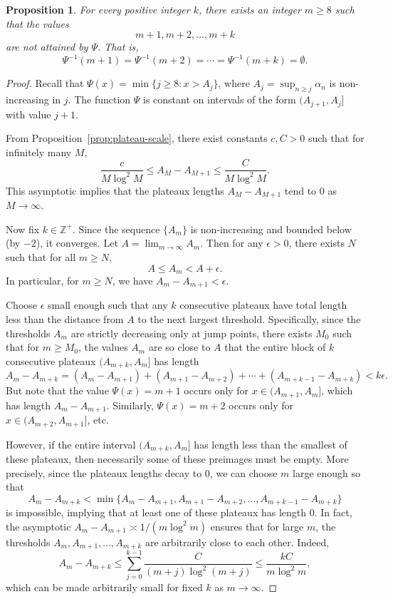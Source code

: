 \documentclass[10pt]{amsart}
\newtheorem{proposition}{Proposition}[section] %
\theoremstyle{definition} %
\numberwithin{equation}{section}
\begin{document}
\begin{proposition}\label{prop:psi-gaps}
For every positive integer $k$, there exists an integer $m \geq 8$ such that the values 
\[
m+1, m+2, \dots, m+k
\]
are not attained by $\Psi$. That is, 
\[
\Psi^{-1}(m+1) = \Psi^{-1}(m+2) = \cdots = \Psi^{-1}(m+k) = \emptyset.
\]
\end{proposition}

\begin{proof}
Recall that $\Psi(x) = \min \{ j \geq 8 : x > A_j \}$, where $A_j = \sup_{n \geq j} \alpha_n$ is non-increasing in $j$. The function $\Psi$ is constant on intervals of the form $(A_{j+1}, A_j]$ with value $j+1$.

From Proposition~\ref{prop:plateau-scale}, there exist constants $c, C > 0$ such that for infinitely many $M$,
\[
\frac{c}{M \log^2 M} \leq A_M - A_{M+1} \leq \frac{C}{M \log^2 M}.
\]
This asymptotic implies that the plateaux lengths $A_M - A_{M+1}$ tend to $0$ as $M \to \infty$.

Now fix $k \in \mathbb{Z}^+$. Since the sequence $\{A_m\}$ is non-increasing and bounded below (by $-2$), it converges. Let $A = \lim_{m \to \infty} A_m$. Then for any $\epsilon > 0$, there exists $N$ such that for all $m \geq N$,
\[
A \leq A_m < A + \epsilon.
\]
In particular, for $m \geq N$, we have $A_m - A_{m+1} < \epsilon$.

Choose $\epsilon$ small enough such that any $k$ consecutive plateaux have total length less than the distance from $A$ to the next largest threshold. Specifically, since the thresholds $A_m$ are strictly decreasing only at jump points, there exists $M_0$ such that for $m \geq M_0$, the values $A_m$ are so close to $A$ that the entire block of $k$ consecutive plateaux $(A_{m+k}, A_m]$ has length
\[
A_m - A_{m+k} = (A_m - A_{m+1}) + (A_{m+1} - A_{m+2}) + \cdots + (A_{m+k-1} - A_{m+k}) < k \epsilon.
\]
But note that the value $\Psi(x) = m+1$ occurs only for $x \in (A_{m+1}, A_m]$, which has length $A_m - A_{m+1}$. Similarly, $\Psi(x) = m+2$ occurs only for $x \in (A_{m+2}, A_{m+1}]$, etc.

However, if the entire interval $(A_{m+k}, A_m]$ has length less than the smallest of these plateaux, then necessarily some of these preimages must be empty. More precisely, since the plateaux lengths decay to $0$, we can choose $m$ large enough so that
\[
A_m - A_{m+k} < \min \{ A_m - A_{m+1}, A_{m+1} - A_{m+2}, \dots, A_{m+k-1} - A_{m+k} \}
\]
is impossible, implying that at least one of these plateaux has length $0$. In fact, the asymptotic $A_m - A_{m+1} \asymp 1/(m \log^2 m)$ ensures that for large $m$, the thresholds $A_m, A_{m+1}, \dots, A_{m+k}$ are arbitrarily close to each other. Indeed,
\[
A_m - A_{m+k} \leq \sum_{j=0}^{k-1} \frac{C}{(m+j) \log^2 (m+j)} \leq \frac{kC}{m \log^2 m},
\]
which can be made arbitrarily small for fixed $k$ as $m \to \infty$.


\end{proof}
\end{document}
